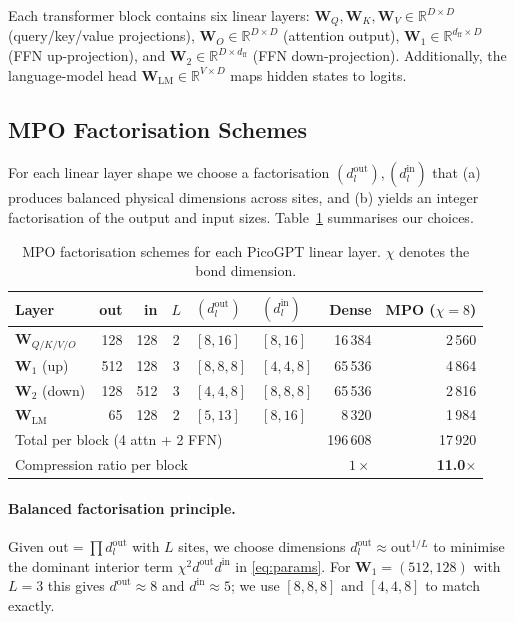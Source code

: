 \documentclass[11pt,a4paper]{article}
\newcommand{\mpomat}[1]{\mathbf{#1}}
\newcommand{\R}{\mathbb{R}}
\theoremstyle{definition}
\begin{document}
Each transformer block contains six linear layers:
$\mpomat{W}_Q, \mpomat{W}_K, \mpomat{W}_V \in \R^{D \times D}$ (query/key/value projections),
$\mpomat{W}_O \in \R^{D \times D}$ (attention output),
$\mpomat{W}_1 \in \R^{d_\text{ff} \times D}$ (FFN up-projection), and
$\mpomat{W}_2 \in \R^{D \times d_\text{ff}}$ (FFN down-projection).
Additionally, the language-model head $\mpomat{W}_\text{LM} \in \R^{V \times D}$ maps hidden states to logits.

\subsection{MPO Factorisation Schemes}

For each linear layer shape we choose a factorisation $(d_l^\text{out}), (d_l^\text{in})$ that (a) produces balanced physical dimensions across sites, and (b) yields an integer factorisation of the output and input sizes. Table~\ref{tab:factorisations} summarises our choices.

\begin{table}[H]
\centering
\caption{MPO factorisation schemes for each PicoGPT linear layer. $\chi$ denotes the bond dimension.}
\label{tab:factorisations}
\begin{tabular}{l r r c l l r r}
\toprule
Layer & out & in & $L$ & $(d_l^\text{out})$ & $(d_l^\text{in})$ & Dense & MPO ($\chi=8$) \\
\midrule
$\mpomat{W}_{Q/K/V/O}$ & 128 & 128 & 2 & $[8,16]$   & $[8,16]$   & 16\,384 & 2\,560 \\
$\mpomat{W}_1$ (up)    & 512 & 128 & 3 & $[8,8,8]$  & $[4,4,8]$  & 65\,536 & 4\,864 \\
$\mpomat{W}_2$ (down)  & 128 & 512 & 3 & $[4,4,8]$  & $[8,8,8]$  & 65\,536 & 2\,816 \\
$\mpomat{W}_\text{LM}$ &  65 & 128 & 2 & $[5,13]$   & $[8,16]$   &  8\,320 & 1\,984 \\
\midrule
\multicolumn{6}{l}{Total per block (4 attn + 2 FFN)} & 196\,608 & 17\,920 \\
\multicolumn{6}{l}{Compression ratio per block}       & $1\times$ & \textbf{11.0}$\times$ \\
\bottomrule
\end{tabular}
\end{table}

\paragraph{Balanced factorisation principle.}
Given $\text{out} = \prod d_l^\text{out}$ with $L$ sites, we choose dimensions $d_l^\text{out} \approx \text{out}^{1/L}$ to minimise the dominant interior term $\chi^2 d^\text{out} d^\text{in}$ in \eqref{eq:params}. For $\mpomat{W}_1 = (512, 128)$ with $L=3$ this gives $d^\text{out} \approx 8$ and $d^\text{in} \approx 5$; we use $[8,8,8]$ and $[4,4,8]$ to match exactly.
\end{document}
